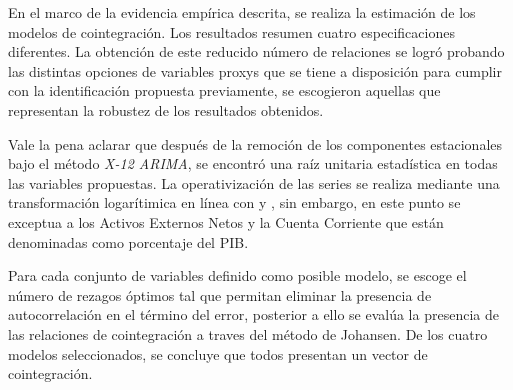 \documentclass[12pt,letterpaper]{article}
\begin{document}
En el marco de la evidencia empírica descrita, se realiza la estimación de los modelos de cointegración. Los resultados resumen cuatro especificaciones diferentes. La obtención de este reducido número de relaciones se logró probando las distintas opciones de variables proxys que se tiene a disposición para cumplir con la identificación propuesta previamente, se escogieron aquellas que representan la robustez de los resultados obtenidos.

Vale la pena aclarar que después de la remoción de los componentes estacionales bajo el método \emph{X-12 ARIMA}, se encontró una raíz unitaria estadística en todas las variables propuestas. La  operativización de las series se realiza mediante una transformación logarítimica en línea con \cite{lane2004trans} y \cite{Obstfeld1995dynamics}, sin embargo, en este punto se exceptua a los Activos Externos Netos y la Cuenta Corriente que están denominadas como porcentaje del PIB. 

Para cada conjunto de variables definido como posible modelo, se escoge el número de rezagos óptimos tal que permitan eliminar la presencia de autocorrelación en el término del error, posterior a ello se evalúa la presencia de las relaciones de cointegración a traves del método de Johansen. De los cuatro modelos seleccionados, se concluye que todos presentan un vector de cointegración.
\end{document}
